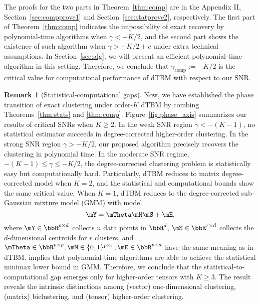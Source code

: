 \documentclass[lettersize,onecolumn,journal]{IEEEtran}
\theoremstyle{definition}
\theoremstyle{definition}
\newtheorem{rmk}{Remark}
\begin{document}
{
\color{blue}
The proofs for the two parts in Theorem~\ref{thm:comp} are in the Appendix II, Section~\ref{sec:compprove1} and Section~\ref{sec:statprove2}, respectively. The first part of Theorem~\ref{thm:comp} indicates the impossibility of exact recovery by polynomial-time algorithms when $\gamma < -K/2$, and the second part shows the existence of such algorithm when $\gamma > -K/2+c$ under extra technical assumptions. In Section~\ref{sec:alg}, we will present an efficient polynomial-time algorithm in this setting. Therefore, we conclude that $\gamma_{\text{comp}}:=-K/2$ is the critical value for computational performance of dTBM with respect to our SNR. 

}


\begin{rmk}[Statistical-computational gaps]
Now, we have established the phase transition of exact clustering under order-$K$ dTBM by combing Theorems~\ref{thm:stats} and \ref{thm:comp}. Figure~\ref{fig:phase_axis} summarizes our results of critical SNRs when $K \geq 2$. In the weak SNR region $\gamma < -(K-1)$, no statistical estimator succeeds in degree-corrected higher-order clustering. In the strong SNR region $\gamma  > -K/2$, our proposed algorithm precisely recovers the clustering in polynomial time. In the moderate SNR regime, $-(K-1)\leq \gamma \leq -K/2$, the degree-corrected clustering problem is statistically easy but computationally hard. Particularly, dTBM reduces to matrix degree-corrected model when $K =2$, and the statistical and computational bounds show the same critical value. When $K =1$, dTBM reduces to the degree-corrected sub-Gaussian mixture model (GMM) with model
\begin{equation}
    \mY = \mTheta \mM \mS + \mE,
\end{equation}
where $\mY \in \bbR^{p \times d}$ collects $n$ data points in $\bbR^d$, $\mS \in \bbR^{r \times d}$ collects the $d$-dimensional centroids for $r$ clusters, and $\mTheta \in \bbR^{p \times p}, \mM \in \{0,1\}^{p \times r}, \mE \in \bbR^{p \times d}$ have the same meaning as in dTBM. \cite{lu2016statistical} implies that polynomial-time algorithms are able to achieve the statistical minimax lower bound in GMM. Therefore, we conclude that the statistical-to-computational gap emerges only for higher-order tensors with $K \geq 3$. The result reveals the intrinsic distinctions among (vector) one-dimensional clustering, (matrix) biclustering, and (tensor) higher-order clustering. 
\end{rmk}
\end{document}
